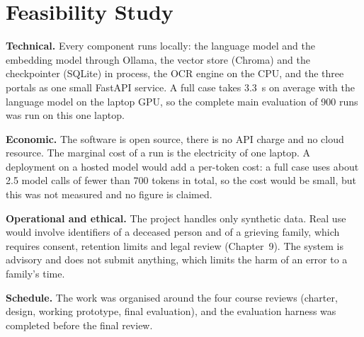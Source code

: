 \section{Feasibility Study}\label{sec:feas}
\textbf{Technical.} Every component runs locally: the language model and the embedding model through Ollama, the vector store (Chroma) and the checkpointer (SQLite) in process, the OCR engine on the CPU, and the three portals as one small FastAPI service. A full case takes 3.3~s on average with the language model on the laptop GPU, so the complete main evaluation of 900 runs was run on this one laptop.

\textbf{Economic.} The software is open source, there is no API charge and no cloud resource. The marginal cost of a run is the electricity of one laptop. A deployment on a hosted model would add a per-token cost: a full case uses about 2.5 model calls of fewer than 700 tokens in total, so the cost would be small, but this was not measured and no figure is claimed.

\textbf{Operational and ethical.} The project handles only synthetic data. Real use would involve identifiers of a deceased person and of a grieving family, which requires consent, retention limits and legal review (Chapter~9). The system is advisory and does not submit anything, which limits the harm of an error to a family's time.

\textbf{Schedule.} The work was organised around the four course reviews (charter, design, working prototype, final evaluation), and the evaluation harness was completed before the final review.

